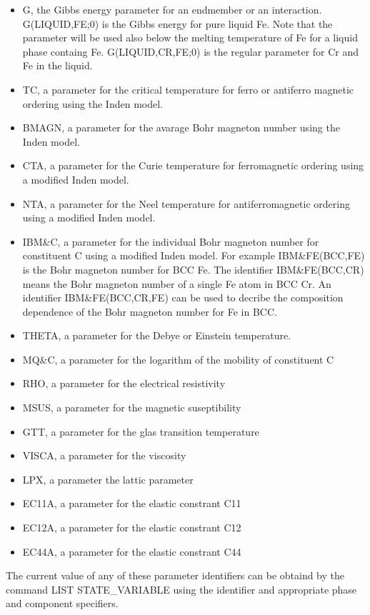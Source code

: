 \documentclass[12pt]{article}
\begin{document}
\begin{itemize}
\item G, the Gibbs energy parameter for an endmember or an
  interaction.  G(LIQUID,FE;0) is the Gibbs energy for pure liquid Fe.
  Note that the parameter will be used also below the melting
  temperature of Fe for a liquid phase containg Fe.  G(LIQUID,CR,FE;0)
  is the regular parameter for Cr and Fe in the liquid.
\item TC, a parameter for the critical temperature for ferro or
  antiferro magnetic ordering using the Inden model.
\item BMAGN, a parameter for the avarage Bohr magneton number using
  the Inden model.
\item CTA, a parameter for the Curie temperature for ferromagnetic
  ordering using a modified Inden model.
\item NTA, a parameter for
 the Neel temperature for antiferromagnetic
  ordering using a modified Inden model.
\item IBM\&C, a parameter for the individual Bohr magneton number for
  constituent C using a modified Inden model.  For example
  IBM\&FE(BCC,FE) is the Bohr magneton number for BCC Fe.  The
  identifier IBM\&FE(BCC,CR) means the Bohr magneton number of a
  single Fe atom in BCC Cr.  An identifier IBM\&FE(BCC,CR,FE) can be
  used to decribe the composition dependence of the Bohr magneton
  number for Fe in BCC.
\item THETA, a parameter for the Debye or Einstein temperature.
\item MQ\&C, a parameter for the logarithm of the mobility of
  constituent C
\item RHO, a parameter for the electrical resistivity
\item MSUS, a parameter for the magnetic suseptibility
\item GTT, a parameter for the glas transition temperature
\item VISCA, a parameter for the viscosity
\item LPX, a parameter the lattic parameter
\item EC11A, a parameter for the elastic constrant C11
\item EC12A, a parameter for the elastic constrant C12
\item EC44A, a parameter for the elastic constrant C44
\end{itemize}

The current value of any of these parameter identifiers can be obtaind
by the command LIST STATE\_VARIABLE using the identifier and
appropriate phase and component specifiers.
\end{document}

